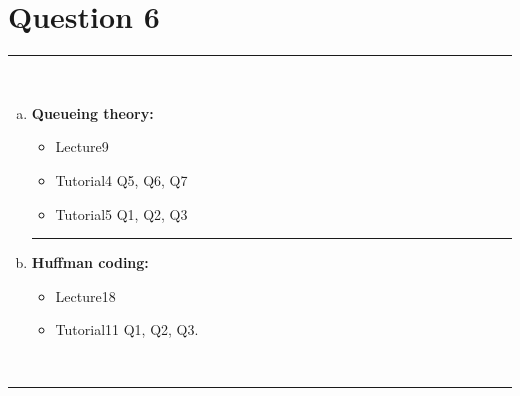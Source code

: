 \documentclass[12pt]{article}
\begin{document}
\section*{Question 6 }
\noindent\rule{\linewidth}{1pt}
\quad\\[-0.5cm]
\begin{enumerate}[a)]
\item {\bf Queueing theory:}
\begin{itemize}
\item Lecture9
\item Tutorial4 Q5, Q6, Q7
\item Tutorial5 Q1, Q2, Q3
\end{itemize}
\begin{center}\noindent\rule{0.4\linewidth}{0.5pt}\end{center}
\item {\bf Huffman coding:}
\begin{itemize}
\item Lecture18 %
\item Tutorial11 Q1, Q2, Q3.
\end{itemize}
\end{enumerate}
\quad\\[-0.3cm]
\noindent\rule{\linewidth}{1pt}

\newpage
\end{document}
